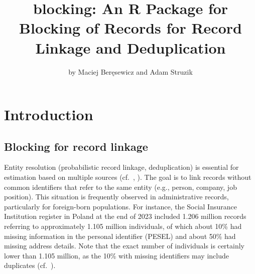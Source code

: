 \title{blocking: An R Package for Blocking of Records for Record Linkage and Deduplication}


\author{by Maciej Beręsewicz and Adam Struzik}

\maketitle


\section{Introduction}\label{introduction}

\subsection{Blocking for record linkage}\label{blocking-for-record-linkage}

Entity resolution (probabilistic record linkage, deduplication) is
essential for estimation based on multiple sources
(cf.~\citet{fellegi1969theory}, \citet{Binette2022}). The goal is to link records
without common identifiers that refer to the same entity (e.g., person,
company, job position). This situation is frequently observed in
administrative records, particularly for foreign-born populations. For
instance, the Social Insurance Institution register in Poland at the end
of 2023 included 1.206 million records referring to approximately 1.105
million individuals, of which about 10\% had missing information in the
personal identifier (PESEL) and about 50\% had missing address details.
Note that the exact number of individuals is certainly lower than 1.105
million, as the 10\% with missing identifiers may include duplicates
(cf.~\citet{beresewicz2025estimation}).

